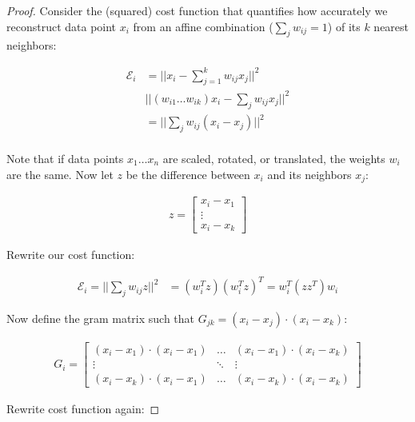 \documentclass{article}
\begin{document}
        \begin{proof}
            Consider the (squared) cost function that quantifies how accurately we reconstruct data point $x_i$ from an affine combination ($ \sum_j w_{ij} = 1$) of its $k$ nearest neighbors:

            \begin{align*}
                \mathcal{E}_i &= ||x_i - \sum_{j=1}^k w_{ij} x_j||^2 \\
                & || (w_{i1} \ldots w_{ik}) x_i - \sum_j w_{ij} x_j||^2 \\
                &= || \sum_j w_{ij} (x_i - x_j) ||^2 \\
            \end{align*}

            Note that if data points $x_1 \ldots x_n$ are scaled, rotated, or translated, the weights $w_i$ are the same. Now let $z$ be the difference between $x_i$ and its neighbors $x_j$:

            \begin{align*}
                z = \begin{bmatrix} x_i - x_1 \\ \vdots \\ x_i - x_k \end{bmatrix}
            \end{align*}

            Rewrite our cost function:

            \begin{align*}
                \mathcal{E}_i = || \sum_j w_{ij} z ||^2 &= (w_i^T z)(w_i^T z)^T = w_i^T (z z^T) w_i
            \end{align*}

            Now define the gram matrix such that $ G_{jk} = (x_i - x_j) \cdot (x_i - x_k)$:

            \begin{align*}
                G_i = \begin{bmatrix}
                    (x_i - x_1) \cdot (x_i - x_1) & \ldots & (x_i - x_1) \cdot (x_i - x_k) \\
                    \vdots & \ddots & \vdots \\
                    (x_i - x_k) \cdot (x_i - x_1) & \ldots & (x_i - x_k) \cdot (x_i - x_k)
                \end{bmatrix}
            \end{align*}

            Rewrite cost function again:


\end{proof}
\end{document}
